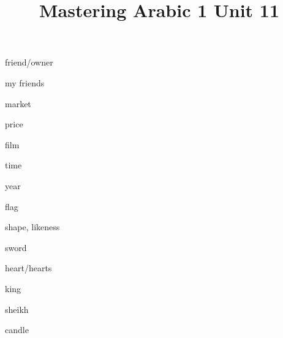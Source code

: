 \documentclass[avery5371,grid,frame]{flashcards}
\title{Mastering Arabic 1 Unit 11}
\begin{document}
\begin{flashcard}{\LARGE friend/owner}
\LARGE {}
\end{flashcard}
\begin{flashcard}{\LARGE my friends}
\LARGE {}
\end{flashcard}
\begin{flashcard}{\LARGE market}
\LARGE {}
\end{flashcard}
\begin{flashcard}{\LARGE price}
\LARGE {}
\end{flashcard}
\begin{flashcard}{\LARGE film}
\LARGE {}
\end{flashcard}
\begin{flashcard}{\LARGE time}
\LARGE {}
\end{flashcard}
\begin{flashcard}{\LARGE year}
\LARGE {}
\end{flashcard}
\begin{flashcard}{\LARGE flag}
\LARGE {}
\end{flashcard}
\begin{flashcard}{\LARGE shape, likeness}
\LARGE {}
\end{flashcard}
\begin{flashcard}{\LARGE sword}
\LARGE {}
\end{flashcard}
\begin{flashcard}{\LARGE heart/hearts}
\LARGE {}
\end{flashcard}
\begin{flashcard}{\LARGE king}
\LARGE {}
\end{flashcard}
\begin{flashcard}{\LARGE sheikh}
\LARGE {}
\end{flashcard}
\begin{flashcard}{\LARGE candle}
\LARGE {}
\end{flashcard}
\end{document}
